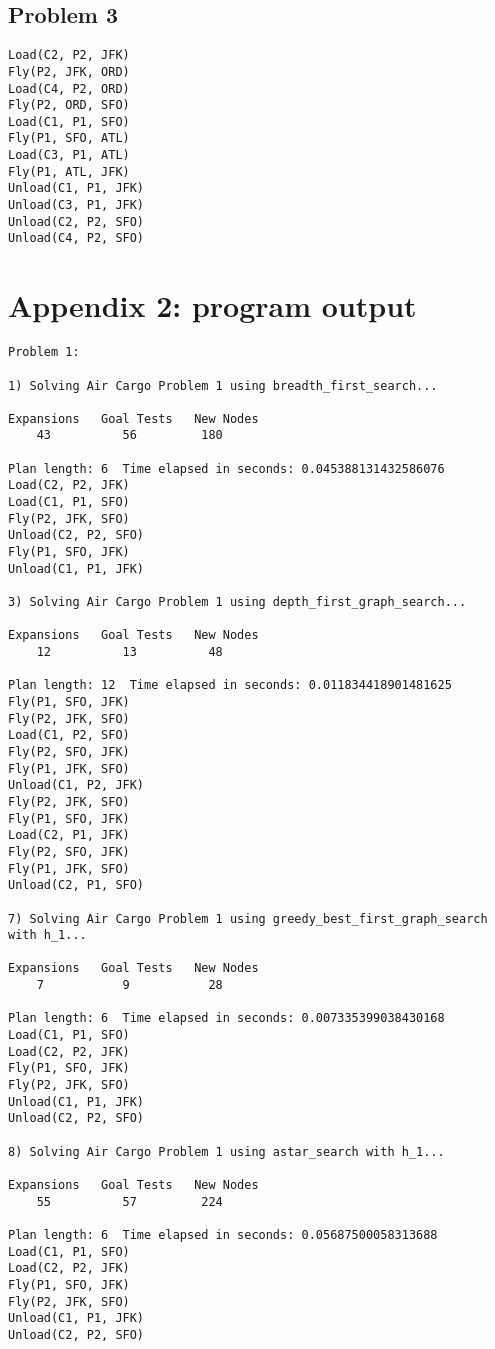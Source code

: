 \documentclass[11pt]{scrartcl}
\begin{document}
\subsection*{Problem 3}\label{problem-3}
\begin{verbatim}
Load(C2, P2, JFK)
Fly(P2, JFK, ORD)
Load(C4, P2, ORD)
Fly(P2, ORD, SFO)
Load(C1, P1, SFO)
Fly(P1, SFO, ATL)
Load(C3, P1, ATL)
Fly(P1, ATL, JFK)
Unload(C1, P1, JFK)
Unload(C3, P1, JFK)
Unload(C2, P2, SFO)
Unload(C4, P2, SFO)
\end{verbatim}
\section*{Appendix 2: program output}\label{appendix-2-program-output}
\begin{verbatim}
Problem 1:

1) Solving Air Cargo Problem 1 using breadth_first_search...

Expansions   Goal Tests   New Nodes
    43          56         180

Plan length: 6  Time elapsed in seconds: 0.045388131432586076
Load(C2, P2, JFK)
Load(C1, P1, SFO)
Fly(P2, JFK, SFO)
Unload(C2, P2, SFO)
Fly(P1, SFO, JFK)
Unload(C1, P1, JFK)

3) Solving Air Cargo Problem 1 using depth_first_graph_search...

Expansions   Goal Tests   New Nodes
    12          13          48

Plan length: 12  Time elapsed in seconds: 0.011834418901481625
Fly(P1, SFO, JFK)
Fly(P2, JFK, SFO)
Load(C1, P2, SFO)
Fly(P2, SFO, JFK)
Fly(P1, JFK, SFO)
Unload(C1, P2, JFK)
Fly(P2, JFK, SFO)
Fly(P1, SFO, JFK)
Load(C2, P1, JFK)
Fly(P2, SFO, JFK)
Fly(P1, JFK, SFO)
Unload(C2, P1, SFO)

7) Solving Air Cargo Problem 1 using greedy_best_first_graph_search with h_1...

Expansions   Goal Tests   New Nodes
    7           9           28

Plan length: 6  Time elapsed in seconds: 0.007335399038430168
Load(C1, P1, SFO)
Load(C2, P2, JFK)
Fly(P1, SFO, JFK)
Fly(P2, JFK, SFO)
Unload(C1, P1, JFK)
Unload(C2, P2, SFO)

8) Solving Air Cargo Problem 1 using astar_search with h_1...

Expansions   Goal Tests   New Nodes
    55          57         224

Plan length: 6  Time elapsed in seconds: 0.05687500058313688
Load(C1, P1, SFO)
Load(C2, P2, JFK)
Fly(P1, SFO, JFK)
Fly(P2, JFK, SFO)
Unload(C1, P1, JFK)
Unload(C2, P2, SFO)


\end{verbatim}
\end{document}
